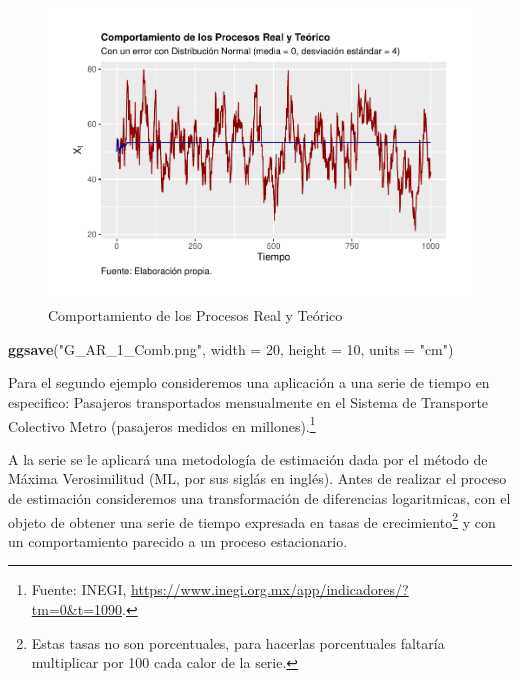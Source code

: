 \documentclass[
]{book}
\newenvironment{Shaded}{\begin{snugshade}}{\end{snugshade}}
\newcommand{\AttributeTok}[1]{\textcolor[rgb]{0.13,0.29,0.53}{#1}}
\newcommand{\DecValTok}[1]{\textcolor[rgb]{0.00,0.00,0.81}{#1}}
\newcommand{\FunctionTok}[1]{\textcolor[rgb]{0.13,0.29,0.53}{\textbf{#1}}}
\newcommand{\NormalTok}[1]{#1}
\newcommand{\StringTok}[1]{\textcolor[rgb]{0.31,0.60,0.02}{#1}}
\begin{document}
\begin{figure}

{\centering \includegraphics{Notas-Series-Tiempo_files/figure-latex/fig45-1} 

}

\caption{Comportamiento de los Procesos Real y Teórico}\label{fig:fig45}
\end{figure}

\begin{Shaded}
\begin{Highlighting}[]
\FunctionTok{ggsave}\NormalTok{(}\StringTok{"G\_AR\_1\_Comb.png"}\NormalTok{, }\AttributeTok{width =} \DecValTok{20}\NormalTok{, }\AttributeTok{height =} \DecValTok{10}\NormalTok{, }\AttributeTok{units =} \StringTok{"cm"}\NormalTok{)}
\end{Highlighting}
\end{Shaded}

Para el segundo ejemplo consideremos una aplicación a una serie de tiempo en especifico: Pasajeros transportados mensualmente en el Sistema de Transporte Colectivo Metro (pasajeros medidos en millones).\footnote{Fuente: INEGI, \url{https://www.inegi.org.mx/app/indicadores/?tm=0&t=1090}.}

A la serie se le aplicará una metodología de estimación dada por el método de Máxima Verosimilitud (ML, por sus siglás en inglés). Antes de realizar el proceso de estimación consideremos una transformación de diferencias logaritmicas, con el objeto de obtener una serie de tiempo expresada en tasas de crecimiento\footnote{Estas tasas no son porcentuales, para hacerlas porcentuales faltaría multiplicar por 100 cada calor de la serie.} y con un comportamiento parecido a un proceso estacionario.
\end{document}
